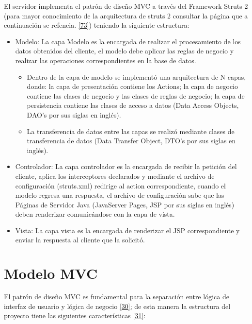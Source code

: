 El servidor implementa el patrón de diseño MVC a través del Framework Struts 2 (para mayor conocimiento de la arquitectura de struts 2 consultar la página que a continuación se refencia. \hyperlink{b73}{[73]}) teniendo la siguiente estructura:
\begin{itemize}
	\item Modelo: La capa Modelo es la encargada de realizar el procesamiento de los datos obtenidos del cliente, el modelo debe aplicar las reglas de negocio y realizar las operaciones correspondientes en la base de datos.
	
	\begin{itemize}
	
	\item Dentro de la capa de modelo se implementó una arquitectura de N capas, donde: la capa de presentación contiene los Actions; la capa de negocio contiene las clases de negocio y las clases de reglas de negocio; la capa de persistencia contiene las clases de acceso a datos (Data Access Objects, DAO’s por sus siglas en inglés).\\
	
	\item La transferencia de datos entre las capas se realizó mediante clases de transferencia de datos (Data Transfer Object,  DTO’s por sus siglas en inglés).
	
	\end{itemize}
	
	\item Controlador: La capa controlador es la encargada de recibir la petición del cliente, aplica los interceptores declarados y mediante el archivo de configuración (struts.xml) redirige al action correspondiente, cuando el modelo regresa una respuesta, el archivo de configuración sabe que las Páginas de Servidor Java (JavaServer Pages, JSP por sus siglas en inglés) deben renderizar comunicándose con la capa de vista.
	
	\item Vista: La capa vista es la encargada de renderizar el JSP correspondiente y enviar la respuesta al cliente que la solicitó.
\end{itemize}


\section{Modelo MVC}
El patrón de diseño MVC es fundamental para la separación entre lógica de interfaz de usuario y lógica de negocio \hyperlink{b30}{[30]}; de esta manera la estructura del proyecto tiene las siguientes características \hyperlink{b31}{[31]}:

